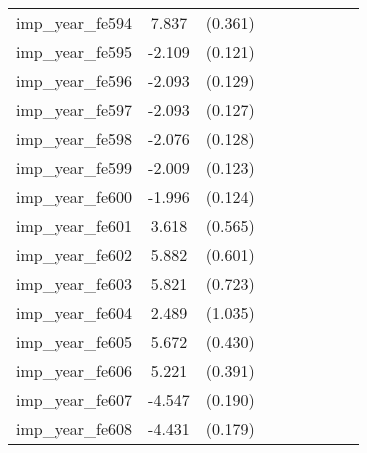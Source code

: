 {\begin{tabular}{l*{4}{cc}}
imp\_year\_fe594&    7.837\sym{***}&  (0.361)&                  &         &                  &         &                  &         \\
imp\_year\_fe595&   -2.109\sym{***}&  (0.121)&                  &         &                  &         &                  &         \\
imp\_year\_fe596&   -2.093\sym{***}&  (0.129)&                  &         &                  &         &                  &         \\
imp\_year\_fe597&   -2.093\sym{***}&  (0.127)&                  &         &                  &         &                  &         \\
imp\_year\_fe598&   -2.076\sym{***}&  (0.128)&                  &         &                  &         &                  &         \\
imp\_year\_fe599&   -2.009\sym{***}&  (0.123)&                  &         &                  &         &                  &         \\
imp\_year\_fe600&   -1.996\sym{***}&  (0.124)&                  &         &                  &         &                  &         \\
imp\_year\_fe601&    3.618\sym{***}&  (0.565)&                  &         &                  &         &                  &         \\
imp\_year\_fe602&    5.882\sym{***}&  (0.601)&                  &         &                  &         &                  &         \\
imp\_year\_fe603&    5.821\sym{***}&  (0.723)&                  &         &                  &         &                  &         \\
imp\_year\_fe604&    2.489\sym{*}  &  (1.035)&                  &         &                  &         &                  &         \\
imp\_year\_fe605&    5.672\sym{***}&  (0.430)&                  &         &                  &         &                  &         \\
imp\_year\_fe606&    5.221\sym{***}&  (0.391)&                  &         &                  &         &                  &         \\
imp\_year\_fe607&   -4.547\sym{***}&  (0.190)&                  &         &                  &         &                  &         \\
imp\_year\_fe608&   -4.431\sym{***}&  (0.179)&                  &         &                  &         &                  &         \\

\end{tabular}}
